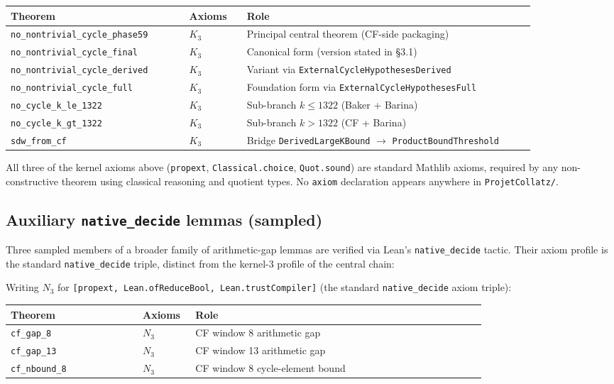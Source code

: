 \documentclass[
  11pt]{amsart}
\theoremstyle{plain}
\theoremstyle{definition}
\theoremstyle{remark}
\begin{document}
{\small
\begin{tabular}{@{}p{0.31\linewidth}p{0.10\linewidth}p{0.50\linewidth}@{}}
\toprule
\textbf{Theorem} & \textbf{Axioms} & \textbf{Role} \\
\midrule
\texttt{no\_nontrivial\_cycle\_phase59} & $K_3$ & Principal central theorem (CF-side packaging) \\
\texttt{no\_nontrivial\_cycle\_final}   & $K_3$ & Canonical form (version stated in §3.1) \\
\texttt{no\_nontrivial\_cycle\_derived} & $K_3$ & Variant via \texttt{ExternalCycleHypothesesDerived} \\
\texttt{no\_nontrivial\_cycle\_full}    & $K_3$ & Foundation form via \texttt{ExternalCycleHypothesesFull} \\
\texttt{no\_cycle\_k\_le\_1322}         & $K_3$ & Sub-branch $k \leq 1322$ (Baker + Barina) \\
\texttt{no\_cycle\_k\_gt\_1322}         & $K_3$ & Sub-branch $k > 1322$ (CF + Barina) \\
\texttt{sdw\_from\_cf}                  & $K_3$ & Bridge \texttt{DerivedLargeKBound} $\to$ \texttt{ProductBoundThreshold} \\
\bottomrule
\end{tabular}}

All three of the kernel axioms above (\texttt{propext},
\texttt{Classical.choice}, \texttt{Quot.sound}) are standard Mathlib
axioms, required by any non-constructive theorem using classical
reasoning and quotient types. No \texttt{axiom} declaration appears
anywhere in \texttt{ProjetCollatz/}.

\subsection{\texorpdfstring{Auxiliary \texttt{native\_decide} lemmas
(sampled)}{Auxiliary native\_decide lemmas (sampled)}}\label{auxiliary-native_decide-lemmas-sampled}

Three sampled members of a broader family of arithmetic-gap lemmas are
verified via Lean's \texttt{native\_decide} tactic. Their axiom profile
is the standard \texttt{native\_decide} triple, distinct from the
kernel-3 profile of the central chain:

Writing \(N_3\) for
\texttt{{[}propext,\ Lean.ofReduceBool,\ Lean.trustCompiler{]}} (the
standard \texttt{native\_decide} axiom triple):

{\small
\begin{tabular}{@{}p{0.25\linewidth}p{0.10\linewidth}p{0.55\linewidth}@{}}
\toprule
\textbf{Theorem} & \textbf{Axioms} & \textbf{Role} \\
\midrule
\texttt{cf\_gap\_8}    & $N_3$ & CF window 8 arithmetic gap \\
\texttt{cf\_gap\_13}   & $N_3$ & CF window 13 arithmetic gap \\
\texttt{cf\_nbound\_8} & $N_3$ & CF window 8 cycle-element bound \\
\bottomrule
\end{tabular}}
\end{document}
